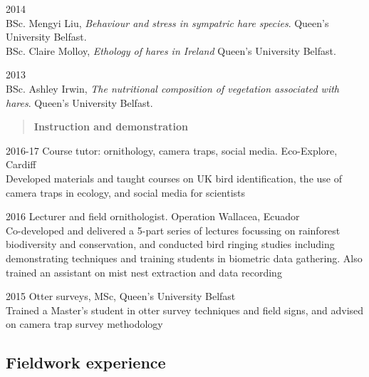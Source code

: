 \documentclass[]{article}
\begin{document}
2014\\
BSc. Mengyi Liu, \emph{Behaviour and stress in sympatric hare species}.
Queen's University Belfast.\\
BSc. Claire Molloy, \emph{Ethology of hares in Ireland} Queen's
University Belfast.

2013\\
BSc. Ashley Irwin, \emph{The nutritional composition of vegetation
associated with hares}. Queen's University Belfast.

\begin{quote}
\textbf{Instruction and demonstration}
\end{quote}

2016-17 Course tutor: ornithology, camera traps, social media.
Eco-Explore, Cardiff\\
Developed materials and taught courses on UK bird identification, the
use of camera traps in ecology, and social media for scientists

2016 Lecturer and field ornithologist. Operation Wallacea, Ecuador\\
Co-developed and delivered a 5-part series of lectures focussing on
rainforest biodiversity and conservation, and conducted bird ringing
studies including demonstrating techniques and training students in
biometric data gathering. Also trained an assistant on mist nest
extraction and data recording

2015 Otter surveys, MSc, Queen's University Belfast\\
Trained a Master's student in otter survey techniques and field signs,
and advised on camera trap survey methodology

\subsection{Fieldwork experience}\label{fieldwork-experience}
\end{document}
